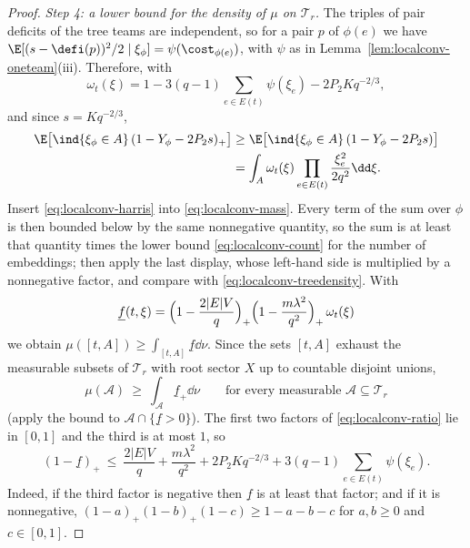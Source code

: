 \begin{proof}
\emph{Step 4: a lower bound for the density of $\mu$ on $\mathcal T_r$.} The triples of pair
deficits of the tree teams are independent, so for a pair $p$ of $\phi(e)$ we have
$\E[(s-\defi(p))^2/2\mid\xi_\phi]=\psi(\cost_{\phi(e)})$, with $\psi$ as in
Lemma~\ref{lem:localconv-oneteam}(iii). Therefore, with
\[
\omega_t(\xi)=1-3(q-1)\sum_{e\in E(t)}\psi(\xi_e)-2P_2Kq^{-2/3},
\]
and since $s=Kq^{-2/3}$,
\begin{align*}
\E\bigl[\ind\{\xi_\phi\in A\}\,(1-Y_\phi-2P_2s)_+\bigr]
&\ge\E\bigl[\ind\{\xi_\phi\in A\}\,(1-Y_\phi-2P_2s)\bigr]\\
&=\int_A\omega_t(\xi)\prod_{e\in E(t)}\frac{\xi_e^2}{2q^2}\dd\xi .
\end{align*}
Insert \eqref{eq:localconv-harris} into \eqref{eq:localconv-mass}. Every term of the sum
over $\phi$ is then bounded below by the same nonnegative quantity, so the sum is at least
that quantity times the lower bound \eqref{eq:localconv-count} for the number of embeddings;
then apply the last display, whose left-hand side is multiplied by a nonnegative factor, and
compare with \eqref{eq:localconv-treedensity}. With
\begin{equation}\label{eq:localconv-ratio}
\underline f(t,\xi)=\Bigl(1-\frac{2|E|V}{q}\Bigr)_+\Bigl(1-\frac{m\lambda^2}{q^2}\Bigr)_+
\,\omega_t(\xi)
\end{equation}
we obtain $\mu([t,A])\ge\int_{[t,A]}\underline f\dd\nu$. Since the sets $[t,A]$ exhaust the
measurable subsets of $\mathcal T_r$ with root sector $X$ up to countable disjoint unions,
\begin{equation}\label{eq:localconv-lower}
\mu(\mathcal A)\ \ge\ \int_{\mathcal A}\underline f_+\dd\nu\qquad\text{for every measurable }
\mathcal A\subseteq\mathcal T_r
\end{equation}
(apply the bound to $\mathcal A\cap\{\underline f>0\}$). The first two factors of
\eqref{eq:localconv-ratio} lie in $[0,1]$ and the third is at most $1$, so
\begin{equation}\label{eq:localconv-oneminus}
(1-\underline f)_+\ \le\ \frac{2|E|V}{q}+\frac{m\lambda^2}{q^2}+2P_2Kq^{-2/3}
+3(q-1)\sum_{e\in E(t)}\psi(\xi_e).
\end{equation}
Indeed, if the third factor is negative then $\underline f$ is at least that factor; and if
it is nonnegative, $(1-a)_+(1-b)_+(1-c)\ge1-a-b-c$ for $a,b\ge0$ and $c\in[0,1]$.


\end{proof}
